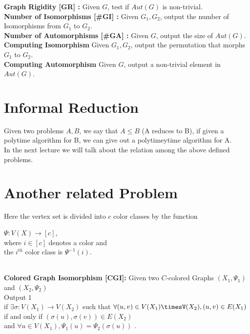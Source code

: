 \textbf{Graph Rigidity [GR] :} Given $G$, test if $Aut(G)$ is non-trivial.\\

\textbf{Number of Isomorphisms [\#GI] :} Given $G_1,G_2$, output the number of Isomorphisms from $G_1$ to $G_2$.\\

\textbf{Number of Automorphisms [\#GA] :} Given $G$, output the size of $Aut(G)$.\\

\textbf{Computing Isomorphism} Given $G_1,G_2$, output the permutation that morphs $G_1$ to $G_2$.\\

\textbf{Computing Automorphism} Given $G$, output a non-trivial element in $Aut(G)$.\\

\section{Informal Reduction} 
Given two problems $A,B$, we say that $A \le B$ (A reduces to B), if given a polytime algorithm for B, we can give out a polytimeytime algorithm for A.\\ 


In the next lecture we will talk about the relation among the above defined problems.




\section{Another related Problem}
Here the vertex set is divided into $c$ color classes by the function 
\begin{center} $\Psi : V(X) \rightarrow [c]$,\\
 where $i \in [c]$ denotes a color and\\
 the $i^{th}$ color class is $\Psi^{-1}(i)$.\end{center}\\

\textbf{Colored Graph Isomorphism [CGI]:} Given two $C$-colored Graphs $(X_1,\Psi_1)$ and $(X_2,\Psi_2)$\\
Output $1$ \\
if $\exists \sigma : V(X_1) \rightarrow V(X_2)$ such that 
$\forall (u,v) \in V(X_1)\timesV(X_2), (u,v) \in E(X_1)$ if and only if $(\sigma(u), \sigma(v)) \in E(X_2) $\\
 and $\forall u \in V(X_1) , \Psi_1(u) = \Psi_2(\sigma(u))$ .

